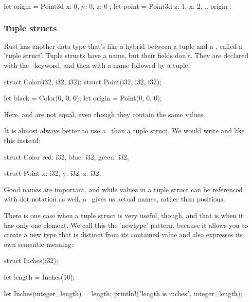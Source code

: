 \begin{rustc}
let origin = Point3d { x: 0, y: 0, z: 0 };
let point = Point3d { z: 1, x: 2, .. origin };
\end{rustc}

\subsubsection*{Tuple structs}
\label{paragraph:tuple_structs}

Rust has another data type that's like a hybrid between a tuple and a \struct, called a 'tuple struct'. Tuple structs have a name, 
but their fields don't. They are declared with the \struct\ keyword, and then with a name followed by a tuple:

\begin{rustc}
struct Color(i32, i32, i32);
struct Point(i32, i32, i32);

let black = Color(0, 0, 0);
let origin = Point(0, 0, 0);
\end{rustc}

Here,  and  are not equal, even though they contain the same values.

\blank

It is almost always better to use a \struct\ than a tuple struct. We would write  and  like this instead:

\begin{rustc}
struct Color {
    red: i32,
    blue: i32,
    green: i32,
}

struct Point {
    x: i32,
    y: i32,
    z: i32,
}
\end{rustc}

Good names are important, and while values in a tuple struct can be referenced with dot notation as well, a \struct\ gives us 
actual names, rather than positions.

\blank

There is one case when a tuple struct is very useful, though, and that is when it has only one element. We call this the 'newtype' 
pattern, because it allows you to create a new type that is distinct from its contained value and also expresses its own semantic 
meaning:

\begin{rustc}
struct Inches(i32);

let length = Inches(10);

let Inches(integer_length) = length;
println!("length is {} inches", integer_length);
\end{rustc}

